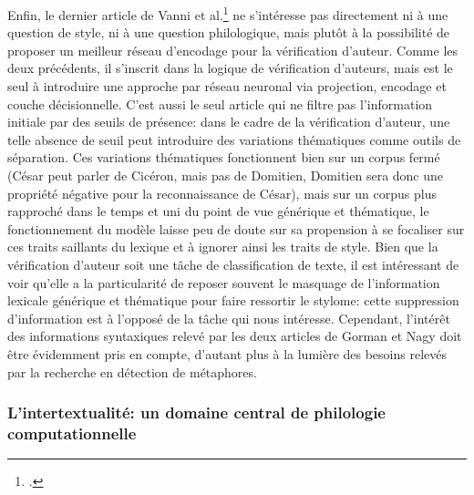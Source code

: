 Enfin, le dernier article de Vanni et al.\footcite{vanni_textual_2018} ne s'intéresse pas directement ni à une question de style, ni à une question philologique, mais plutôt à la possibilité de proposer un meilleur réseau d'encodage pour la vérification d'auteur. Comme les deux précédents, il s'inscrit dans la logique de vérification d'auteurs, mais est le seul à introduire une approche par réseau neuronal via projection, encodage et couche décisionnelle. C'est aussi le seul article qui ne filtre pas l'information initiale par des seuils de présence: dans le cadre de la vérification d'auteur, une telle absence de seuil peut introduire des variations thématiques comme outils de séparation. Ces variations thématiques fonctionnent bien sur un corpus fermé (César peut parler de Cicéron, mais pas de Domitien, Domitien sera donc une propriété négative pour la reconnaissance de César), mais sur un corpus plus rapproché dans le temps et uni du point de vue générique et thématique, le fonctionnement du modèle laisse peu de doute sur sa propension à se focaliser sur ces traits saillants du lexique et à ignorer ainsi les traits de style.%
Bien que la vérification d'auteur soit une tâche de classification de texte, il est intéressant de voir qu'elle a la particularité de reposer souvent le masquage de l'information lexicale générique et thématique pour faire ressortir le stylome: cette suppression d'information est à l'opposé de la tâche qui nous intéresse. Cependant, l'intérêt des informations syntaxiques relevé par les deux articles de Gorman et Nagy doit être évidemment pris en compte, d'autant plus à la lumière des besoins relevés par la recherche en détection de métaphores.


\subsubsection{L'intertextualité: un domaine central de philologie computationnelle}

